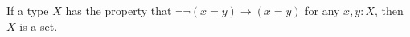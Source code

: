 \documentclass[hott-all.tex]{subfiles}
\begin{document}
% 
% 
% 
% 
% 
\begin{cor}
  If a type $X$ has the property that $\neg\neg(x=y)\to(x=y)$ for any $x,y:X$, then $X$ is a set.
\end{cor}
% 
\end{document}
